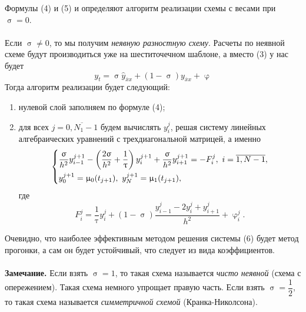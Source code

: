 \documentclass[a4paper, 12pt]{report}
\numberwithin{equation}{section}
\newcommand{\ol}{\overline}
\renewcommand{\varphi}{\upvarphi}
\renewcommand{\tau}{\uptau}
\renewcommand{\sigma}{\upsigma}
\renewcommand{\mu}{\upmu}
\begin{document}
	Формулы (4) и (5) и определяют алгоритм реализации схемы с весами при $\sigma = 0$. \\\\
	Если $\sigma \ne 0$, то мы получим \textit{неявную разностную схему}. Расчеты по неявной схеме будут производиться уже на шеститочечном шаблоне, а вместо (3) у нас будет
	\begin{equation}
		y_t = \sigma \hat y_{\ol x x} + (1- \sigma)y_{\ol x x} + \varphi
	\end{equation}
	Тогда алгоритм реализации будет следующий:
	\begin{enumerate}
		\item нулевой слой заполняем по формуле (4);
		\item для всех $j = \ol {0, N_1-1}$ будем вычислять $y_i^j$, решая систему линейных алгебраических уравнений с трехдиагональной матрицей, а именно
		\begin{equation}
			\begin{dcases}
			\dfrac{\sigma}{h^2}y_{i-1}^{j+1} - \left(\dfrac{2\sigma}{h^2} + \dfrac 1 \tau\right) y_i^{j+1} + \dfrac {\sigma}{h^2} y_{i+1}^{j+1} = - F_i^j,\ i = \overline {1, N-1},\\
			y_0^{j+1} = \mu_0(t_{j+1}),\ y_N^{j+1} = \mu_1(t_{j+1}),
		\end{dcases}
		\end{equation}
		где $$F_i^j = \dfrac 1 \tau y_i^j + (1-\sigma) \dfrac{y_{i-1}^j - 2 y_i^j + y_{i+1}^j}{h^2} + \varphi_i^j.$$
	\end{enumerate}
	Очевидно, что наиболее эффективным методом решения системы (6) будет метод прогонки, а сам он будет устойчивый, что следует из вида коэффициентов.\\\\
	\textbf{Замечание.} Если взять $\sigma = 1$, то такая схема называется \textit{чисто неявной} (схема с опережением). Такая схема немного упрощает правую часть. Если взять $\sigma = \dfrac 12$, то такая схема называется \textit{симметричной схемой} (Кранка-Николсона).
\end{document}
